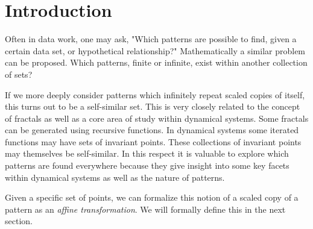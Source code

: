 \chapter{Introduction}


Often in data work, one may ask, "Which patterns are possible to find, given a certain data set, or hypothetical relationship?"  Mathematically a similar problem can be proposed.  Which patterns, finite or infinite, exist within another collection of sets?  

If we more deeply consider patterns which infinitely repeat scaled copies of itself, this turns out to be a self-similar set.  This is very closely related to the concept of fractals as well as a core area of study within dynamical systems.  Some fractals can be generated using recursive functions.  In dynamical systems some iterated functions may have sets of invariant points.  These collections of invariant points may themselves be self-similar.  In this respect it is valuable to explore which patterns are found everywhere because they give insight into some key facets within dynamical systems as well as the nature of patterns.  

Given a specific set of points, we can formalize this notion of a scaled copy of a pattern as an \textit{affine transformation}.  We will formally define this in the next section.

